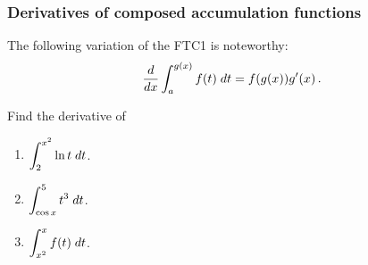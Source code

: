 \documentclass[10pt,t,handout,ignorenonframetext,aspectratio=169]{beamer}
\begin{document}
\begin{frame}
  \frametitle{Derivatives of composed accumulation functions}

  The following variation of the FTC1 is noteworthy:
  \[
    \frac{d}{\mathop{}\!d x} \int_a^{g(x)} f(t) \; dt = f(g(x)) g'(x) \,.
  \]
\end{frame}

\begin{frame}
  \vs
  \question{} Find the derivative of
  \begin{enumerate}
  \item  $\displaystyle \int_2^{x^2} \ln t \; dt$.
    \vfill
  \item $\displaystyle \int_{\cos x}^{5} t^3 \; dt$.
    \vfill
  \item $\displaystyle \int_{x^2}^x f(t) \; dt$.
    \vfill
  \end{enumerate}
\end{frame}
\end{document}
